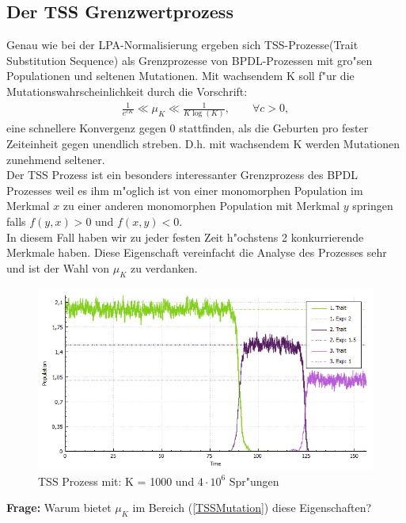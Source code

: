 \documentclass[11pt, a4paper, german]{article}
\theoremstyle{plain}
\begin{document}
	\subsection{Der TSS Grenzwertprozess}
	Genau wie bei der LPA-Normalisierung ergeben sich TSS-Prozesse(Trait Substitution Sequence) als Grenzprozesse von BPDL-Prozessen mit gro"sen Populationen und seltenen Mutationen. Mit wachsendem K  soll f"ur die Mutationswahrscheinlichkeit durch die Vorschrift:
	\begin{align}
		\frac{1}{e^{cK}} \ll \mu_K \ll \frac{1}{K \log(K)}, \qquad \forall c > 0, \label{TSSMutation}
	\end{align}
	eine schnellere Konvergenz gegen 0 stattfinden, als die Geburten pro fester Zeiteinheit gegen unendlich streben. D.h. mit wachsendem K werden Mutationen zunehmend seltener.\\ 
	Der TSS Prozess ist ein besonders interessanter Grenzprozess des BPDL Prozesses weil es ihm m"oglich ist von einer monomorphen Population im Merkmal $ x $ zu einer anderen monomorphen Population mit Merkmal $ y $ springen falls $ f(y,x) > 0 $ und $ f(x,y) < 0 $.\\
	In diesem Fall haben wir zu jeder festen Zeit h"ochstens 2 konkurrierende Merkmale haben. Diese Eigenschaft vereinfacht die Analyse des Prozesses sehr und ist der Wahl von $ \mu_K $ zu verdanken.\\
	\begin{figure}[H]
		\centering
		\includegraphics[width=1 \linewidth]{../BachelorArbeit/Pictures/TSS2_pure_small}
		\caption[TSS Prozess wechselnder Dominanz]{TSS Prozess mit: K = 1000 und $ 4 \cdot 10^6 $ Spr"ungen}
		\label{fig:TSS2_pure_small}
	\end{figure}
	\textbf{Frage:} Warum bietet $ \mu_K $ im Bereich (\ref{TSSMutation}) diese Eigenschaften?\\
	
\end{document}
